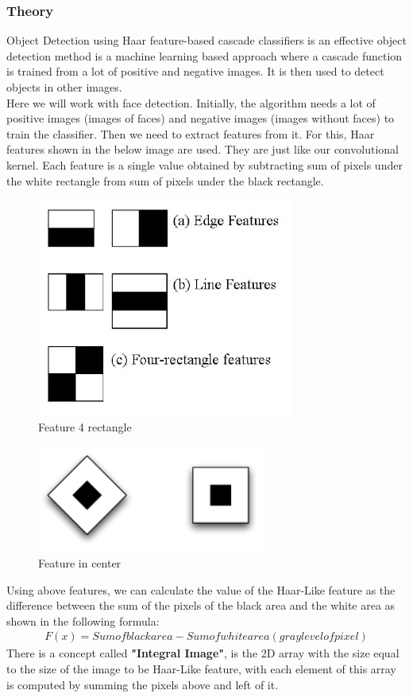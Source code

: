         \subsubsection{Theory}
            Object Detection using Haar feature-based cascade classifiers is an effective object detection method is a machine learning based approach where a cascade function is trained from a lot of positive and negative images. It is then used to detect objects in other images. \\ 
            \vspace{3mm}
            Here we will work with face detection. Initially, the algorithm needs a lot of positive images (images of faces) and negative images (images without faces) to train the classifier. Then we need to extract features from it. For this, Haar features shown in the below image 
            are used. They are just like our convolutional kernel. Each feature is a single value obtained by subtracting sum of pixels under the white rectangle from sum of pixels under the black rectangle.
            \begin{figure}[H]
                \centering
                \includegraphics[width=0.6\linewidth]{img/haar_features.jpg}
                \caption{Feature 4 rectangle}
            \end{figure}
            \begin{figure}[H]
                \centering
                \includegraphics[width=0.6\linewidth]{img/feature_center.png}
                \caption{Feature in center}
            \end{figure}
            Using above features, we can calculate the value of the Haar-Like feature as the difference between the sum of the pixels of the black area and the white area as shown in the following formula:
            \begin{align}
                F(x) = Sum of black area - Sum of white area (gray level of pixel)
            \end{align} 
            There is a concept called \textbf{"Integral Image"}, is the 2D array with the size equal to the size of the image to be Haar-Like feature, with each element of this array is computed by summing the pixels above and left of it.
